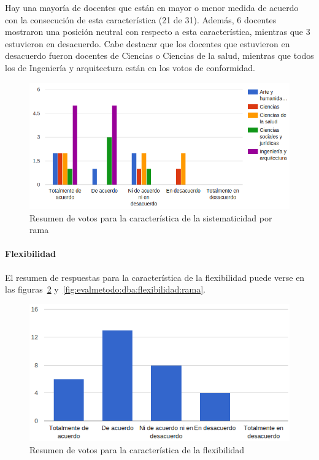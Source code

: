Hay una mayoría de docentes que están en mayor o menor medida de acuerdo con la consecución de esta característica (21 de 31). Además, 6 docentes mostraron una posición neutral con respecto a esta característica, mientras que 3 estuvieron en desacuerdo. Cabe destacar que los docentes que estuvieron en desacuerdo fueron docentes de Ciencias o Ciencias de la salud, mientras que todos los de Ingeniería y arquitectura están en los votos de conformidad.

\begin{figure}[h]
  \begin{center}
    \includegraphics[scale=0.5]{C_DBA_sistematicidad_rama.png}
  \end{center}
  \caption{Resumen de votos para la característica de la sistematicidad por rama}
  \label{fig:evalmetodo:dba:sistematicidad:rama}
\end{figure}


\newpage
\paragraph*{Flexibilidad}

El resumen de respuestas para la característica de la flexibilidad puede verse en las figuras~\ref{fig:evalmetodo:dba:flexibilidad} y~\ref{fig:evalmetodo:dba:flexibilidad:rama}.

\begin{figure}[h]
  \begin{center}
    \includegraphics[scale=0.5]{C_DBA_flexibilidad.png}
  \end{center}
  \caption{Resumen de votos para la característica de la flexibilidad}
  \label{fig:evalmetodo:dba:flexibilidad}
\end{figure}

